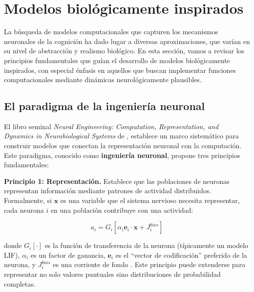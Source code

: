 
\section{Modelos biológicamente inspirados}
\label{sec:modelos_biologicos}

La búsqueda de modelos computacionales que capturen los mecanismos neuronales de la cognición ha dado lugar a diversas aproximaciones, que varían en su nivel de abstracción y realismo biológico. En esta sección, vamos a revisar los principios fundamentales que guían el desarrollo de modelos biológicamente inspirados, con especial énfasis en aquellos que buscan implementar funciones computacionales mediante dinámicas neurológicamente plausibles.

\subsection{El paradigma de la ingeniería neuronal}
\label{subsec:ingenieria_neuronal}

El libro seminal \textit{Neural Engineering: Computation, Representation, and Dynamics in Neurobiological Systems} de \citet{eliasmith2003neural}, establece un marco sistemático para construir modelos que conectan la representación neuronal con la computación. Este paradigma, conocido como \textbf{ingeniería neuronal}, propone tres principios fundamentales:

\textbf{Principio 1: Representación.} Establece que las poblaciones de neuronas representan información mediante patrones de actividad distribuidos. Formalmente, si $\mathbf{x}$ es una variable que el sistema nervioso necesita representar, cada neurona $i$ en una población contribuye con una actividad:

\begin{equation}
a_i = G_i[\alpha_i \mathbf{e}_i \cdot \mathbf{x} + J_i^{bias}]
\label{eq:neural_encoding}
\end{equation}

donde $G_i[\cdot]$ es la función de transferencia de la neurona (típicamente un modelo LIF), $\alpha_i$ es un factor de ganancia, $\mathbf{e}_i$ es el ``vector de codificación'' preferido de la neurona, y $J_i^{bias}$ es una corriente de fondo \citep{eliasmith2003neural}. Este principio puede extenderse para representar no solo valores puntuales sino distribuciones de probabilidad completas.

